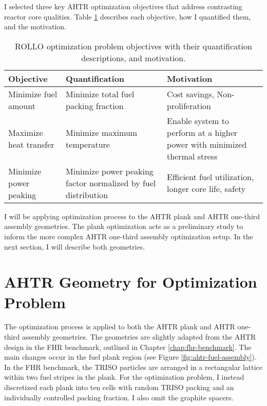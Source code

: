 I selected three key \gls{AHTR} optimization objectives that address contrasting reactor 
core qualities. 
Table \ref{tab:objectives} describes each objective, how I quantified them, and the motivation.
\begin{table}[]
    \centering
    \onehalfspacing
    \caption{\acrfull{ROLLO} optimization problem objectives with their quantification 
    descriptions, and motivation.}
	\label{tab:objectives}
    \footnotesize
    \begin{tabular}{p{4cm}p{5cm}p{5cm}}
    \hline 
    \textbf{Objective}& \textbf{Quantification}& \textbf{Motivation} \\
    \hline
    Minimize fuel amount & Minimize total fuel packing fraction & Cost savings, Non-proliferation \\ 
    \hline
    Maximize heat transfer & Minimize maximum temperature & Enable system to perform at a higher power with minimized thermal stress \\
    \hline
    Minimize power peaking & Minimize power peaking factor normalized by fuel distribution & Efficient fuel utilization, longer core life, safety\\
    \hline
    \end{tabular}
\end{table}
I will be applying optimization process to the \gls{AHTR} plank and \gls{AHTR} one-third
assembly geometries.
The plank optimization acts as a preliminary study to inform the more complex \gls{AHTR} one-third
assembly optimization setup. 
In the next section, I will describe both geometries. 

\section{AHTR Geometry for Optimization Problem}
The optimization process is applied to both the \gls{AHTR} plank and \gls{AHTR} one-third
assembly geometries.
The geometries are slightly adapted from the \gls{AHTR} design in the \gls{FHR} benchmark,
outlined in Chapter \ref{chap:fhr-benchmark}.
The main changes occur in the fuel plank region (see Figure \ref{fig:ahtr-fuel-assembly}). 
In the \gls{FHR} benchmark, the TRISO particles are arranged in a rectangular lattice within
two fuel stripes in the plank. 
For the optimization problem, I instead discretized each plank into ten cells with random 
TRISO packing and an individually controlled packing fraction. 
I also omit the graphite spacers. 

